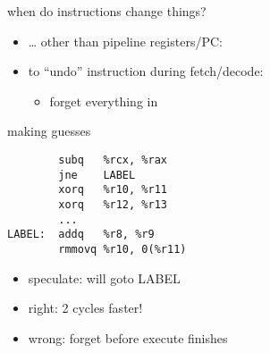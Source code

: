 \begin{frame}{when do instructions change things?}
\begin{itemize}
\item \ldots{} other than pipeline registers/PC: \\
\item<2-> to ``undo'' instruction during fetch/decode:
    \begin{itemize}
    \item forget everything in 
    \end{itemize}
\end{itemize}
\end{frame}

\begin{frame}[fragile,label=makingGuesses]{making guesses}
\begin{lstlisting}
        subq   %rcx, %rax
        jne    LABEL
        xorq   %r10, %r11
        xorq   %r12, %r13
        ...
LABEL:  addq   %r8, %r9
        rmmovq %r10, 0(%r11)
\end{lstlisting}
\begin{itemize}
    \item speculate:  will goto LABEL
    \item right: 2 cycles faster!
    \item wrong: forget before execute finishes
\end{itemize}
\end{frame}

